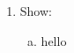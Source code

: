 \documentclass[paper=a4, fontsize=11pt]{scrartcl}
\begin{document}
\begin{enumerate}
  \item Show: \\
    \begin{enumerate}[(a)]
      \item hello
    \end{enumerate}
\end{enumerate}
\end{document}
